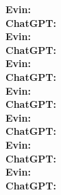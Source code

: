 \documentclass{article}[10pt]
\begin{document}
\noindent \textbf{Evin:}\\

\noindent \textbf{ChatGPT:}\\

\noindent \textbf{Evin:}\\

\noindent \textbf{ChatGPT:}\\

\noindent \textbf{Evin:}\\

\noindent \textbf{ChatGPT:}\\

\noindent \textbf{Evin:}\\

\noindent \textbf{ChatGPT:}\\

\noindent \textbf{Evin:}\\

\noindent \textbf{ChatGPT:}\\

\noindent \textbf{Evin:}\\

\noindent \textbf{ChatGPT:}\\

\noindent \textbf{Evin:}\\

\noindent \textbf{ChatGPT:}\\
\end{document}
